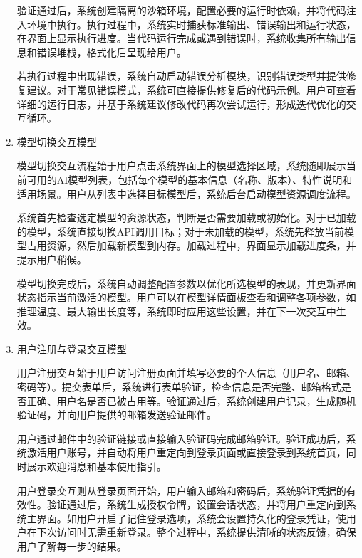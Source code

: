 \documentclass[
    report,     %
    oneside,    %
    UTF8,       %
    zihao=-4    %
]{config} %
\begin{document}
\begin{enumerate}[label=(\arabic*)]
    验证通过后，系统创建隔离的沙箱环境，配置必要的运行时依赖，并将代码注入环境中执行。执行过程中，系统实时捕获标准输出、错误输出和运行状态，在界面上显示执行进度。当代码运行完成或遇到错误时，系统收集所有输出信息和错误堆栈，格式化后呈现给用户。
    
    若执行过程中出现错误，系统自动启动错误分析模块，识别错误类型并提供修复建议。对于常见错误模式，系统可直接提供修复后的代码示例。用户可查看详细的运行日志，并基于系统建议修改代码再次尝试运行，形成迭代优化的交互循环。
    
    \item 模型切换交互模型
    
    模型切换交互流程始于用户点击系统界面上的模型选择区域，系统随即展示当前可用的AI模型列表，包括每个模型的基本信息（名称、版本）、特性说明和适用场景。用户从列表中选择目标模型后，系统后台启动模型资源调度流程。
    
    系统首先检查选定模型的资源状态，判断是否需要加载或初始化。对于已加载的模型，系统直接切换API调用目标；对于未加载的模型，系统先释放当前模型占用资源，然后加载新模型到内存。加载过程中，界面显示加载进度条，并提示用户稍候。
    
    模型切换完成后，系统自动调整配置参数以优化所选模型的表现，并更新界面状态指示当前激活的模型。用户可以在模型详情面板查看和调整各项参数，如推理温度、最大输出长度等，系统即时应用这些设置，并在下一次交互中生效。
    
    \item 用户注册与登录交互模型
    
    用户注册交互始于用户访问注册页面并填写必要的个人信息（用户名、邮箱、密码等）。提交表单后，系统进行表单验证，检查信息是否完整、邮箱格式是否正确、用户名是否已被占用等。验证通过后，系统创建用户记录，生成随机验证码，并向用户提供的邮箱发送验证邮件。
    
    用户通过邮件中的验证链接或直接输入验证码完成邮箱验证。验证成功后，系统激活用户账号，并自动将用户重定向到登录页面或直接登录到系统首页，同时展示欢迎消息和基本使用指引。
    
    用户登录交互则从登录页面开始，用户输入邮箱和密码后，系统验证凭据的有效性。验证通过后，系统生成授权令牌，设置会话状态，并将用户重定向到系统主界面。如用户开启了记住登录选项，系统会设置持久化的登录凭证，使用户在下次访问时无需重新登录。整个过程中，系统提供清晰的状态反馈，确保用户了解每一步的结果。
\end{enumerate}
\end{document}
